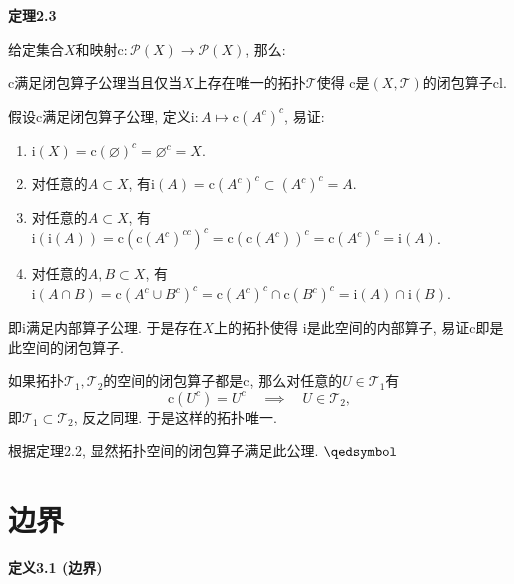 \vspace{10pt}

\hypertarget{sec:定理2.3}{}
\noindent\textbf{定理2.3}

给定集合$X$和映射$\mathrm{c}:\mathcal{P}(X)\to\mathcal{P}(X)$, 那么:

$\mathrm{c}$满足闭包算子公理当且仅当$X$上存在唯一的拓扑$\mathcal{T}$使得
$\mathrm{c}$是$(X,\mathcal{T})$的闭包算子$\mathrm{cl}$.



假设$\mathrm{c}$满足闭包算子公理, 定义$\mathrm{i}:A\mapsto\mathrm{c}(A^c)^c$, 易证:
\begin{enumerate}
    \item $\mathrm{i}(X)=\mathrm{c}(\varnothing)^c=\varnothing^c=X$.
    \item 对任意的$A\subset X$, 有$\mathrm{i}(A)=\mathrm{c}(A^c)^c\subset(A^c)^c=A$.
    \item 对任意的$A\subset X$, 有$\mathrm{i}(\mathrm{i}(A))=
    \mathrm{c}(\mathrm{c}(A^c)^{cc})^c=\mathrm{c}(\mathrm{c}(A^c))^c=
    \mathrm{c}(A^c)^c=\mathrm{i}(A)$.
    \item 对任意的$A,B\subset X$, 有$\mathrm{i}(A\cap B)=
    \mathrm{c}(A^c\cup B^c)^c=\mathrm{c}(A^c)^c\cap\mathrm{c}(B^c)^c
    =\mathrm{i}(A)\cap\mathrm{i}(B)$.
\end{enumerate}
即$\mathrm{i}$满足内部算子公理. 于是存在$X$上的拓扑使得
$\mathrm{i}$是此空间的内部算子, 易证$\mathrm{c}$即是此空间的闭包算子.

如果拓扑$\mathcal{T}_1,\mathcal{T}_2$的空间的闭包算子都是$\mathrm{c}$,
那么对任意的$U\in\mathcal{T}_1$有
\[
    \mathrm{c}(U^c)=U^c\quad\implies\quad U\in\mathcal{T}_2,
\]
即$\mathcal{T}_1\subset\mathcal{T}_2$, 反之同理. 于是这样的拓扑唯一.


根据定理2.2, 显然拓扑空间的闭包算子满足此公理. \hfill $\qedsymbol$






\vspace{20pt}

\section{边界}

\hypertarget{sec:定义3.1}{}
\noindent\textbf{定义3.1 (边界)}

